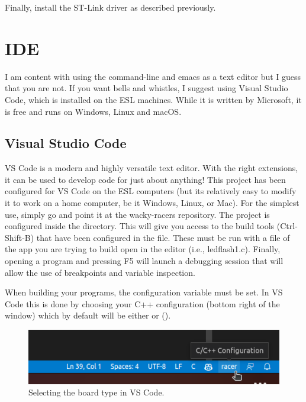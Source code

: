 Finally, install the ST-Link driver as described previously.

\section{IDE}

I am content with using the command-line and emacs as a text editor but I
guess that you are not.  If you want bells and whistles, I suggest using
Visual Studio Code, which is installed on the ESL machines.  While it is
written by Microsoft, it is free and runs on Windows, Linux and macOS.


\subsection{Visual Studio Code}

VS Code is a modern and highly versatile text editor.  With the right
extensions, it can be used to develop code for just about anything!
This project has been configured for VS Code on the ESL computers (but
its relatively easy to modify it to work on a home computer, be it
Windows, Linux, or Mac). For the simplest use, simply go  and point it at the wacky-racers repository. The project
is configured inside the  directory. This will give you
access to the build tools (Ctrl-Shift-B) that have been configured in
the  file. These must be run with a file of
the app you are trying to build open in the editor (i.e.,
ledflash1.c). Finally, opening a program and pressing F5 will launch a
debugging session that will allow the use of breakpoints and variable
inspection.

When building your programs, the  configuration variable
must be set. In VS Code this is done by choosing your C++
configuration (bottom right of the window) which by default will be
either  or  ().

\begin{figure}
\centering
\includegraphics{figs/vscode-config.png}
\caption{Selecting the board type in VS Code.}
\label{fig:vscode-config}
\end{figure}

